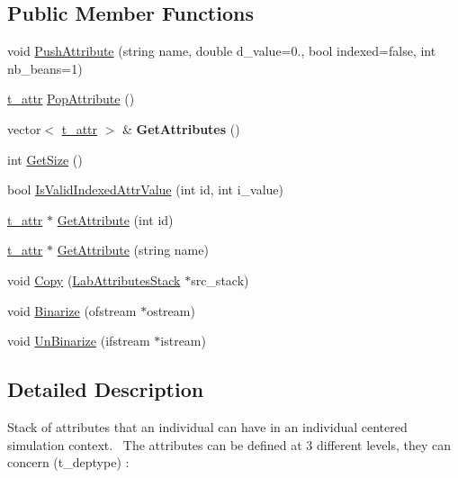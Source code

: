 \subsection*{Public Member Functions}
\begin{DoxyCompactItemize}
\item 
void \hyperlink{classelps_1_1_lab_attributes_stack_a564a406c6bbe3c1ad056f8f85b514b9a}{Push\+Attribute} (string name, double d\+\_\+value=0., bool indexed=false, int nb\+\_\+beans=1)
\item 
\hyperlink{structelps_1_1_lab_attributes_stack_1_1t__attr}{t\+\_\+attr} \hyperlink{classelps_1_1_lab_attributes_stack_a9503f1ccc86d3951b36516779b1ccc42}{Pop\+Attribute} ()
\item 
\hypertarget{classelps_1_1_lab_attributes_stack_a9ca6c24b5fed3962ab0ca23980371a5d}{vector$<$ \hyperlink{structelps_1_1_lab_attributes_stack_1_1t__attr}{t\+\_\+attr} $>$ \& {\bfseries Get\+Attributes} ()}\label{classelps_1_1_lab_attributes_stack_a9ca6c24b5fed3962ab0ca23980371a5d}

\item 
int \hyperlink{classelps_1_1_lab_attributes_stack_ab0604c901140f1e6ac35727ff5cd297b}{Get\+Size} ()
\item 
bool \hyperlink{classelps_1_1_lab_attributes_stack_aabaad817098a7b2a5c8837159523b3b0}{Is\+Valid\+Indexed\+Attr\+Value} (int id, int i\+\_\+value)
\item 
\hyperlink{structelps_1_1_lab_attributes_stack_1_1t__attr}{t\+\_\+attr} $\ast$ \hyperlink{classelps_1_1_lab_attributes_stack_afb6687f7a42e439cc1811e36294da232}{Get\+Attribute} (int id)
\item 
\hyperlink{structelps_1_1_lab_attributes_stack_1_1t__attr}{t\+\_\+attr} $\ast$ \hyperlink{classelps_1_1_lab_attributes_stack_aa2568c1e3668aeaf23815d203a2f700b}{Get\+Attribute} (string name)
\item 
void \hyperlink{classelps_1_1_lab_attributes_stack_a5f112b3c81d7e7fa6cb54d0cd879c70e}{Copy} (\hyperlink{classelps_1_1_lab_attributes_stack}{Lab\+Attributes\+Stack} $\ast$src\+\_\+stack)
\item 
void \hyperlink{classelps_1_1_lab_attributes_stack_a071d6153765174e869d743d435aa04df}{Binarize} (ofstream $\ast$ostream)
\item 
void \hyperlink{classelps_1_1_lab_attributes_stack_abc03b7e9c4afaeeed3493398a1353e2b}{Un\+Binarize} (ifstream $\ast$istream)
\end{DoxyCompactItemize}


\subsection{Detailed Description}
Stack of attributes that an individual can have in an individual centered simulation context.~\newline
 The attributes can be defined at 3 different levels, they can concern (t\+\_\+deptype) \+:


